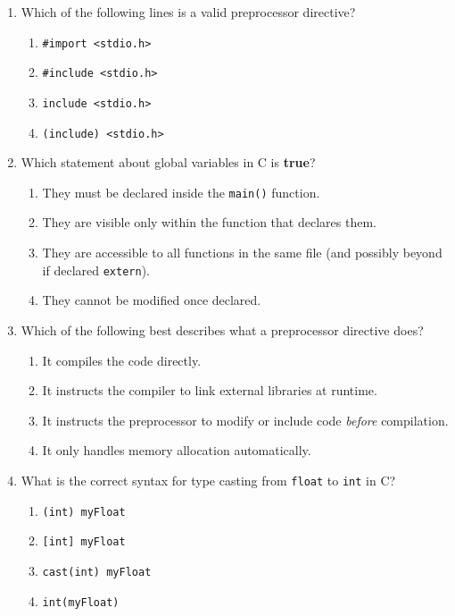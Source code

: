 \documentclass[a4paper,12pt]{article}
\begin{document}
\begin{enumerate}
  \item Which of the following lines is a valid preprocessor directive?
  \begin{enumerate}[label=(\alph*)]
    \item \texttt{\#import <stdio.h>}
    \item \texttt{\#include <stdio.h>}
    \item \texttt{include <stdio.h>}
    \item \texttt{(include) <stdio.h>}
  \end{enumerate}

  \item Which statement about global variables in C is \textbf{true}?
  \begin{enumerate}[label=(\alph*)]
    \item They must be declared inside the \texttt{main()} function.
    \item They are visible only within the function that declares them.
    \item They are accessible to all functions in the same file (and possibly beyond if declared \texttt{extern}).
    \item They cannot be modified once declared.
  \end{enumerate}

  \item Which of the following best describes what a preprocessor directive does?
  \begin{enumerate}[label=(\alph*)]
    \item It compiles the code directly.
    \item It instructs the compiler to link external libraries at runtime.
    \item It instructs the preprocessor to modify or include code \emph{before} compilation.
    \item It only handles memory allocation automatically.
  \end{enumerate}

  \item What is the correct syntax for type casting from \texttt{float} to \texttt{int} in C?
  \begin{enumerate}[label=(\alph*)]
    \item \texttt{(int) myFloat}
    \item \texttt{[int] myFloat}
    \item \texttt{cast(int) myFloat}
    \item \texttt{int(myFloat)}
  \end{enumerate}


\end{enumerate}
\end{document}
